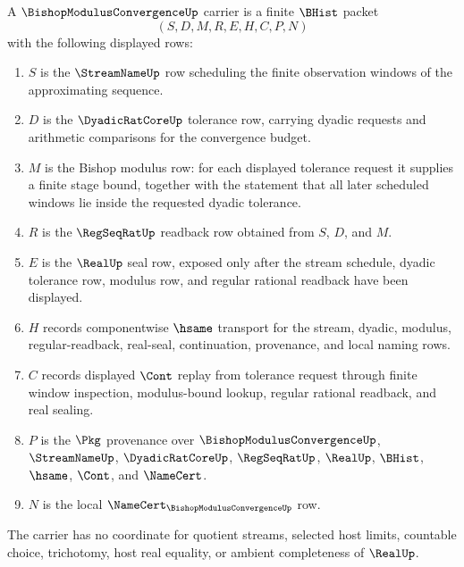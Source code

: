 \begin{definition}
\label{def:bishop-modulus-convergence-carrier}
A $\BishopModulusConvergenceUp$ carrier is a finite $\BHist$ packet
$$
(S,D,M,R,E,H,C,P,N)
$$
with the following displayed rows:
\begin{enumerate}
\item $S$ is the $\StreamNameUp$ row scheduling the finite observation windows of the approximating sequence.
\item $D$ is the $\DyadicRatCoreUp$ tolerance row, carrying dyadic requests and arithmetic comparisons for the convergence budget.
\item $M$ is the Bishop modulus row: for each displayed tolerance request it supplies a finite stage bound, together with the statement that all later scheduled windows lie inside the requested dyadic tolerance.
\item $R$ is the $\RegSeqRatUp$ readback row obtained from $S$, $D$, and $M$.
\item $E$ is the $\RealUp$ seal row, exposed only after the stream schedule, dyadic tolerance row, modulus row, and regular rational readback have been displayed.
\item $H$ records componentwise $\hsame$ transport for the stream, dyadic, modulus, regular-readback, real-seal, continuation, provenance, and local naming rows.
\item $C$ records displayed $\Cont$ replay from tolerance request through finite window inspection, modulus-bound lookup, regular rational readback, and real sealing.
\item $P$ is the $\Pkg$ provenance over $\BishopModulusConvergenceUp$, $\StreamNameUp$, $\DyadicRatCoreUp$, $\RegSeqRatUp$, $\RealUp$, $\BHist$, $\hsame$, $\Cont$, and $\NameCert$.
\item $N$ is the local $\NameCert_{\BishopModulusConvergenceUp}$ row.
\end{enumerate}
The carrier has no coordinate for quotient streams, selected host limits, countable choice, trichotomy, host real equality, or ambient completeness of $\RealUp$.
\end{definition}

